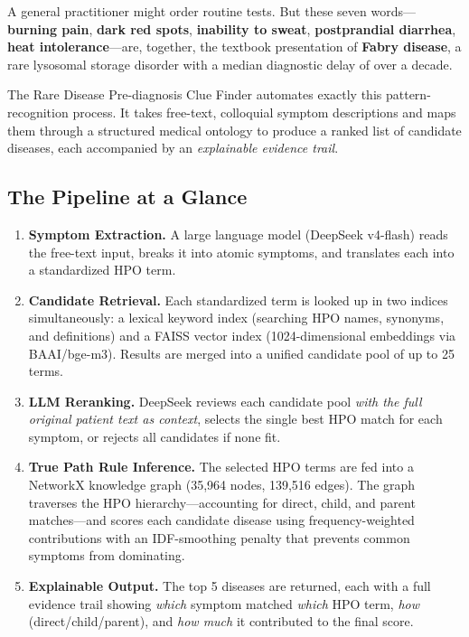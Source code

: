 \documentclass[11pt,a4paper]{article}
\begin{document}
A general practitioner might order routine tests. But these seven words—\textbf{burning pain}, \textbf{dark red spots}, \textbf{inability to sweat}, \textbf{postprandial diarrhea}, \textbf{heat intolerance}—are, together, the textbook presentation of \textbf{Fabry disease}, a rare lysosomal storage disorder with a median diagnostic delay of over a decade.

The Rare Disease Pre-diagnosis Clue Finder automates exactly this pattern-recognition process. It takes free-text, colloquial symptom descriptions and maps them through a structured medical ontology to produce a ranked list of candidate diseases, each accompanied by an \textit{explainable evidence trail}.

\subsection{The Pipeline at a Glance}

\begin{enumerate}[leftmargin=*,itemsep=4pt]
  \item \textbf{Symptom Extraction.} A large language model (DeepSeek v4-flash) reads the free-text input, breaks it into atomic symptoms, and translates each into a standardized HPO term.
  \item \textbf{Candidate Retrieval.} Each standardized term is looked up in two indices simultaneously: a lexical keyword index (searching HPO names, synonyms, and definitions) and a FAISS vector index (1024-dimensional embeddings via BAAI/bge-m3). Results are merged into a unified candidate pool of up to 25 terms.
  \item \textbf{LLM Reranking.} DeepSeek reviews each candidate pool \textit{with the full original patient text as context}, selects the single best HPO match for each symptom, or rejects all candidates if none fit.
  \item \textbf{True Path Rule Inference.} The selected HPO terms are fed into a NetworkX knowledge graph (35,964 nodes, 139,516 edges). The graph traverses the HPO hierarchy—accounting for direct, child, and parent matches—and scores each candidate disease using frequency-weighted contributions with an IDF-smoothing penalty that prevents common symptoms from dominating.
  \item \textbf{Explainable Output.} The top 5 diseases are returned, each with a full evidence trail showing \textit{which} symptom matched \textit{which} HPO term, \textit{how} (direct/child/parent), and \textit{how much} it contributed to the final score.
\end{enumerate}
\end{document}
